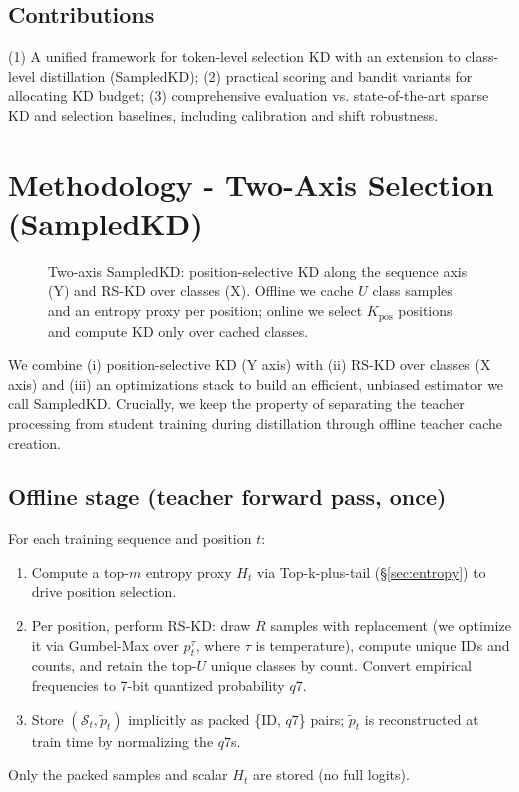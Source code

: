 \documentclass[11pt]{article}
\begin{document}
\subsection{Contributions}
(1) A unified framework for token-level selection KD with an extension to class-level distillation (SampledKD);
(2) practical scoring and bandit variants for allocating KD budget;
(3) comprehensive evaluation vs. state-of-the-art sparse KD and selection baselines, including calibration and shift robustness.


\section{Methodology - Two-Axis Selection (SampledKD)}

\FloatBarrier

\label{sec:twoaxis}
\begin{figure}[h!]
	\centering
	\resizebox{\columnwidth}{!}{}
	\resizebox{\columnwidth}{!}{}
	\caption{Two-axis SampledKD: position-selective KD along the sequence axis (Y) and RS-KD over classes (X). Offline we cache $U$ class samples and an entropy proxy per position; online we select $K_{\text{pos}}$ positions and compute KD only over cached classes.}
	\label{fig:two-axis}
\end{figure}

\FloatBarrier

We combine (i) position-selective KD (Y axis) with (ii) RS-KD over classes (X axis) and (iii) an optimizations stack to build an efficient, unbiased estimator we call SampledKD.
Crucially, we keep the property of separating the teacher processing from student training during distillation through offline teacher cache creation.

\subsection{Offline stage (teacher forward pass, once)}
For each training sequence and position $t$:
\begin{enumerate}
	\item Compute a top-$m$ entropy proxy $H_t$ via Top-k-plus-tail (\S\ref{sec:entropy}) to drive position selection.
	\item Per position, perform RS-KD: draw $R$ samples with replacement (we optimize it via Gumbel-Max over $p_t^\tau$, where $\tau$ is temperature), compute unique IDs and counts, and retain the top-$U$ unique classes by count.
	      Convert empirical frequencies to 7-bit quantized probability $q7$.
	\item Store $(\mathcal{S}_t,\tilde p_t)$ implicitly as packed \{ID, $q7$\} pairs; $\tilde p_t$ is reconstructed at train time by normalizing the $q7$s.
\end{enumerate}
Only the packed samples and scalar $H_t$ are stored (no full logits).
\end{document}
